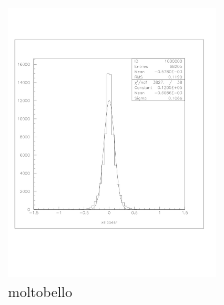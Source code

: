\documentclass[a4paper]{article}
\begin{document}
\begin{figure}[!htb]
  \includegraphics[width=0.49\textwidth]{ex_images/1_050_140_xse.jpg}
  \caption{moltobello}
  \label{fig:050_xse}
\end{figure}
\end{document}
